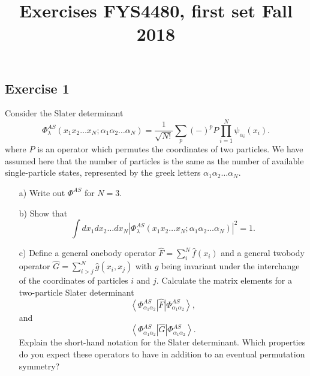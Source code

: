 \documentclass[prc]{revtex4}
\newcommand{\bra}[1]{\left\langle #1 \right|}
\newcommand{\ket}[1]{\left| #1 \right\rangle}
\begin{document}
\title{Exercises FYS4480, first set Fall 2018}
\maketitle


\subsection*{Exercise 1}
Consider the Slater determinant
\[
\Phi_{\lambda}^{AS}(x_{1}x_{2}\dots x_{N};\alpha_{1}\alpha_{2}\dots\alpha_{N})
=\frac{1}{\sqrt{N!}}\sum_{p}(-)^{p}P\prod_{i=1}^{N}\psi_{\alpha_{i}}(x_{i}).
\]
where $P$ is an operator which permutes the coordinates of two particles. We have assumed here that the 
number of particles is the same as the number of available single-particle states, represented by the
greek letters $\alpha_{1}\alpha_{2}\dots\alpha_{N}$.
\begin{enumerate}
\item[a)] Write  out $\Phi^{AS}$ for $N=3$.  
\item[b)] Show that
\[
\int dx_{1}dx_{2}\dots dx_{N}\left\vert
\Phi_{\lambda}^{AS}(x_{1}x_{2}\dots x_{N};\alpha_{1}\alpha_{2}\dots\alpha_{N})
\right\vert^{2} = 1.
\]
\item[c)] Define a general onebody operator $\hat{F} = \sum_{i}^N\hat{f}(x_{i})$ and a general 
twobody operator $\hat{G}=\sum_{i>j}^N\hat{g}(x_{i},x_{j})$
with $g$ being invariant under the interchange of the coordinates of particles $i$ and $j$.
Calculate the matrix elements for a two-particle Slater determinant
\[
\bra{\Phi_{\alpha_{1}\alpha_{2}}^{AS}}\hat{F}\ket{\Phi_{\alpha_{1}\alpha_{2}}^{AS}},
\]
and
\[
\bra{\Phi_{\alpha_{1}\alpha_{2}}^{AS}}\hat{G}\ket{\Phi_{\alpha_{1}\alpha_{2}}^{AS}}.
\]
Explain the short-hand notation for the Slater determinant.
Which properties do you expect these operators to have in addition to an eventual permutation
symmetry?
\end{enumerate}
\end{document}
